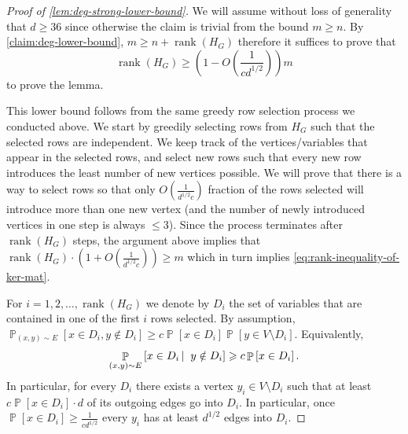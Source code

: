 \documentclass[10pt,a4paper]{article}
\newcommand{\prettyref}[1]{\cref{#1}}
\theoremstyle{definition}
\theoremstyle{remark}
\newcommand{\Psymb}{\mathbb{P}}
\DeclareMathOperator*{\ProbOp}{\Psymb}
\renewcommand{\Pr}{\ProbOp}
\newcommand{\prob}[1]{\Pr \left[ {#1} \right] }
\newcommand{\Prob}[2][]{\Pr_{{#1}}\left[#2\right]} %
\newcommand{\cProb}[3]{\Pr_{{#1}}\left[ #2 \left| \; \vphantom{#2 #3} \right. #3  \right]} %
\DeclareMathOperator{\rank}{rank}
\renewcommand{\le}{\leqslant}
\renewcommand{\geq}{\geqslant}
\renewcommand{\ge}{\geqslant}
\numberwithin{equation}{section}
\let\pref=\prettyref
\begin{document}
\begin{proof}[Proof of \pref{lem:deg-strong-lower-bound}]
    We will assume without loss of generality that \(d \geq 36\) since otherwise the claim is trivial from the bound \(m\geq n\).
    By \pref{claim:deg-lower-bound}, \(m \geq n + \rank(H_G)\) therefore it suffices to prove that 
    \begin{equation}\label{eq:rank-inequality-of-ker-mat}
    \rank(H_G) \geq \left( 1-O \left(\frac{1}{c d^{1/2}} \right) \right) m
    \end{equation}
    to prove the lemma.

    This lower bound follows from the same greedy row selection process we conducted above. We start by greedily selecting rows from \(H_G\) such that the selected rows are independent. We keep track of the vertices/variables that appear in the selected rows, and select new rows such that every new row introduces the least number of new vertices possible. We will prove that there is a way to select rows so that only \(O(\frac{1}{d^{1/2}c})\) fraction of the rows selected will introduce more than one new vertex (and the number of newly introduced vertices in one step is always \(\le 3\)). Since the process terminates after \(\rank(H_G)\) steps, the argument above implies that \(\rank(H_G)\cdot (1+ O(\frac{1}{d^{1/2}c})) \geq m\) which in turn implies \eqref{eq:rank-inequality-of-ker-mat}.
    
    For \(i=1,2,\dots,\rank(H_G)\) we denote by \(D_i\) the set of variables that are contained in one of the first \(i\) rows selected. By assumption, \(\Prob[(x,y)\sim E]{x\in D_i, y \notin D_i} \ge c \prob{x\in D_i} \prob{y\in V \setminus D_i}\). Equivalently,
    \[\cProb{(x,y)\sim E}{x \in D_i}{y \notin D_i} \geq c \prob{x\in D_i}.\]
    In particular, for every \(D_i\) there exists a vertex \(y_i \in V \setminus D_i\) such that at least \(c\prob{x\in D_i} \cdot d\) of its outgoing edges go into \(D_i\). In particular, once \(\prob{x\in D_i} \geq \frac{1}{c d^{1/2}}\) every \(y_i\) has at least \(d^{1/2}\) edges into \(D_i\).


\end{proof}
\end{document}
